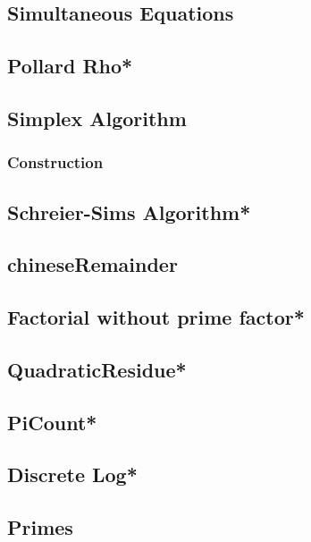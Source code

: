 \subsection{Simultaneous Equations}

\subsection{Pollard Rho*} %

\subsection{Simplex Algorithm}

\subsubsection{Construction}

\subsection{Schreier-Sims Algorithm*} %

\subsection{chineseRemainder}

\subsection{Factorial without prime factor*} %

\subsection{QuadraticResidue*} %

\subsection{PiCount*} %

\subsection{Discrete Log*} %

\subsection{Primes}

